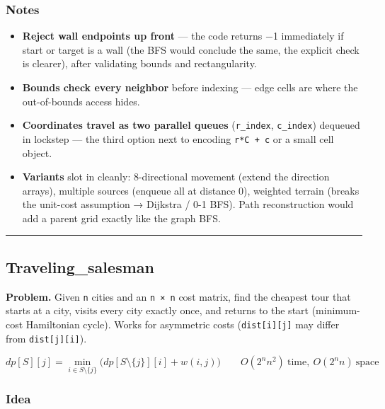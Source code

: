 \documentclass[
  10pt,
  letterpaper,
  onecolumn]{article}
\providecommand{\tightlist}{%
  \setlength{\itemsep}{0pt}\setlength{\parskip}{0pt}}
\begin{document}
\hypertarget{notes-15}{%
\subsubsection{Notes}\label{notes-15}}

\begin{itemize}
\tightlist
\item
  \textbf{Reject wall endpoints up front} --- the code returns −1
  immediately if start or target is a wall (the BFS would conclude the
  same, the explicit check is clearer), after validating bounds and
  rectangularity.
\item
  \textbf{Bounds check every neighbor} before indexing --- edge cells
  are where the out-of-bounds access hides.
\item
  \textbf{Coordinates travel as two parallel queues} (\texttt{r\_index},
  \texttt{c\_index}) dequeued in lockstep --- the third option next to
  encoding \texttt{r*C\ +\ c} or a small cell object.
\item
  \textbf{Variants} slot in cleanly: 8-directional movement (extend the
  direction arrays), multiple sources (enqueue all at distance 0),
  weighted terrain (breaks the unit-cost assumption → Dijkstra / 0-1
  BFS). Path reconstruction would add a parent grid exactly like the
  graph BFS.
\end{itemize}

\begin{center}\rule{0.5\linewidth}{0.5pt}\end{center}

\hypertarget{traveling_salesman}{%
\subsection{Traveling\_salesman}\label{traveling_salesman}}

\textbf{Problem.} Given \texttt{n} cities and an \texttt{n\ ×\ n} cost
matrix, find the cheapest tour that starts at a city, visits every city
exactly once, and returns to the start (minimum-cost Hamiltonian cycle).
Works for asymmetric costs (\texttt{dist{[}i{]}{[}j{]}} may differ from
\texttt{dist{[}j{]}{[}i{]}}).

\begin{equation*}
dp[S][j]=\min_{i\in S\setminus\{j\}}\bigl(dp[S\setminus\{j\}][i]+w(i,j)\bigr)
\qquad O(2^{n}n^{2})\ \text{time},\ O(2^{n}n)\ \text{space}
\end{equation*}

\hypertarget{idea-18}{%
\subsubsection{Idea}\label{idea-18}}
\end{document}
